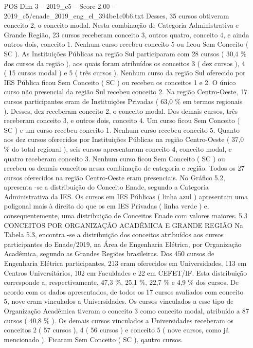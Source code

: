 \begin{textsample}{POS Dim 3 – 2019\_c5 – Score 2.00 – 2019\_c5/enade\_2019\_eng\_el\_394be1c0b6.txt}
Desses, 35 cursos obtiveram conceito 2, o conceito modal.
Nesta combinação de Categoria Administrativa e Grande Região, 23 cursos receberam conceito 3, outros quatro, conceito 4, e ainda outros dois, conceito 1.
Nenhum curso recebeu conceito 5 ou ficou Sem Conceito ( SC ).
As Instituições Públicas na região Sul participaram com 28 cursos ( 30,4 \% dos cursos da região ), aos quais foram atribuídos os conceitos 3 ( dez cursos ), 4 ( 15 cursos modal ) e 5 ( três cursos ).
Nenhum curso da região Sul oferecido por IES Pública ficou Sem Conceito ( SC ) ou recebeu os conceitos 1 e 2.
O único curso não presencial da região Sul recebeu conceito 2.
Na região Centro-Oeste, 17 cursos participantes eram de Instituições Privadas ( 63,0 \% em termos regionais ).
Desses, dez receberam conceito 2, o conceito modal.
Dos demais cursos, três receberam conceito 3, e outros dois, conceito 4.
Um curso ficou Sem Conceito ( SC ) e um curso recebeu conceito 1.
Nenhum curso recebeu conceito 5.
Quanto aos dez cursos oferecidos por Instituições Públicas na região Centro-Oeste ( 37,0 \% do total regional ), seis cursos apresentaram conceito 4, conceito modal, e quatro receberam conceito 3.
Nenhum curso ficou Sem Conceito ( SC ) ou recebeu os demais conceitos nessa combinação de categoria e região.
Todos os 27 cursos oferecidos na região Centro-Oeste eram presenciais.
No Gráfico 5.2, apresenta -se a distribuição do Conceito Enade, segundo a Categoria Administrativa da IES.
Os cursos em IES Públicas ( linha azul ) apresentam uma poligonal mais à direita do que os em IES Privadas ( linha verde ) e, consequentemente, uma distribuição de Conceitos Enade com valores maiores. 5.3 CONCEITOS POR ORGANIZAÇÃO ACADÊMICA E GRANDE REGIÃO Na Tabela 5.3, encontra -se a distribuição dos conceitos atribuídos aos cursos participantes do Enade/2019, na Área de Engenharia Elétrica, por Organização Acadêmica, segundo as Grandes Regiões brasileiras.
Dos 450 cursos de Engenharia Elétrica participantes, 213 eram oferecidos em Universidades, 113 em Centros Universitários, 102 em Faculdades e 22 em CEFET/IF.
Esta distribuição corresponde a, respectivamente, 47,3 \%, 25,1 \%, 22,7 \% e 4,9 \% dos cursos.
De acordo com os dados apresentados, de todos os 17 cursos avaliados com conceito 5, nove eram vinculados a Universidades.
Os cursos vinculados a esse tipo de Organização Acadêmica tiveram o conceito 3 como conceito modal, atribuído a 87 cursos ( 40,8 \% ).
Os demais cursos vinculados a Universidades receberam os conceitos 2 ( 57 cursos ), 4 ( 56 cursos ) e conceito 5 ( nove cursos, como já mencionado ).
Ficaram Sem Conceito ( SC ), qautro cursos.

\end{textsample}
